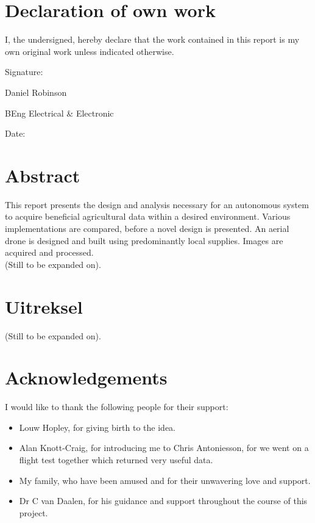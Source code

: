 \setcounter{secnumdepth}{-2}%

\newpage
\chapter{Declaration of own work}

I, the undersigned, hereby declare that the work contained in this report is my own original work
unless indicated otherwise.

\vspace{2.5cm}   

Signature: \hrulefill

\hspace*{0mm}\phantom{Signature: }Daniel Robinson

\hspace*{0mm}\phantom{Signature: }BEng Electrical \& Electronic

\vspace{1cm}   

Date:\space\space\space\space\space\hrulefill

\chapter{Abstract}

This report presents the design and analysis necessary for an autonomous system to acquire beneficial agricultural data within a desired environment. Various implementations are compared, before a novel design is presented. An aerial drone is designed and built using predominantly local supplies. Images are acquired and processed.\\

\noindent
(Still to be expanded on).

\chapter{Uitreksel}

(Still to be expanded on).

\chapter{Acknowledgements}

I would like to thank the following people for their support:
\begin{itemize}
    \item Louw Hopley, for giving birth to the idea.
    \item Alan Knott-Craig, for introducing me to Chris Antoniesson, for we went on a flight test together which returned very useful data.
    \item My family, who have been amused and for their unwavering love and support.
    \item Dr C van Daalen, for his guidance and support throughout the course of this project.
\end{itemize}

